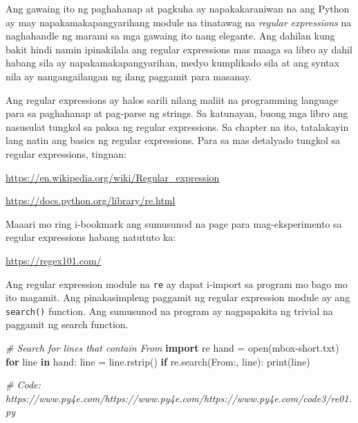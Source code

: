 \documentclass[10pt,]{book}
\newenvironment{Shaded}{}{}
\newcommand{\BuiltInTok}[1]{\textcolor[rgb]{0.00,0.50,0.00}{#1}}
\newcommand{\CommentTok}[1]{\textcolor[rgb]{0.38,0.63,0.69}{\textit{#1}}}
\newcommand{\ControlFlowTok}[1]{\textcolor[rgb]{0.00,0.44,0.13}{\textbf{#1}}}
\newcommand{\ImportTok}[1]{\textcolor[rgb]{0.00,0.50,0.00}{\textbf{#1}}}
\newcommand{\KeywordTok}[1]{\textcolor[rgb]{0.00,0.44,0.13}{\textbf{#1}}}
\newcommand{\NormalTok}[1]{#1}
\newcommand{\OperatorTok}[1]{\textcolor[rgb]{0.40,0.40,0.40}{#1}}
\newcommand{\StringTok}[1]{\textcolor[rgb]{0.25,0.44,0.63}{#1}}
\begin{document}
Ang gawaing ito ng paghahanap at pagkuha ay napakakaraniwan na ang
Python ay may napakamakapangyarihang module na tinatawag na
\emph{regular expressions} na naghahandle ng marami sa mga gawaing ito
nang elegante. Ang dahilan kung bakit hindi namin ipinakilala ang
regular expressions mas maaga sa libro ay dahil habang sila ay
napakamakapangyarihan, medyo kumplikado sila at ang syntax nila ay
nangangailangan ng ilang paggamit para masanay.

Ang regular expressions ay halos sarili nilang maliit na programming
language para sa paghahanap at pag-parse ng strings. Sa katunayan, buong
mga libro ang nasusulat tungkol sa paksa ng regular expressions. Sa
chapter na ito, tatalakayin lang natin ang basics ng regular
expressions. Para sa mas detalyado tungkol sa regular expressions,
tingnan:

\url{https://en.wikipedia.org/wiki/Regular_expression}

\url{https://docs.python.org/library/re.html}

Maaari mo ring i-bookmark ang sumusunod na page para mag-eksperimento sa
regular expressions habang natututo ka:

\url{https://regex101.com/}

Ang regular expression module na \texttt{re} ay dapat i-import sa
program mo bago mo ito magamit. Ang pinakasimpleng paggamit ng regular
expression module ay ang \texttt{search()} function. Ang sumusunod na
program ay nagpapakita ng trivial na paggamit ng search function.


\begin{Shaded}
\begin{Highlighting}[]
\CommentTok{\# Search for lines that contain \textquotesingle{}From\textquotesingle{}}
\ImportTok{import}\NormalTok{ re}
\NormalTok{hand }\OperatorTok{=} \BuiltInTok{open}\NormalTok{(}\StringTok{\textquotesingle{}mbox{-}short.txt\textquotesingle{}}\NormalTok{)}
\ControlFlowTok{for}\NormalTok{ line }\KeywordTok{in}\NormalTok{ hand:}
\NormalTok{    line }\OperatorTok{=}\NormalTok{ line.rstrip()}
    \ControlFlowTok{if}\NormalTok{ re.search(}\StringTok{\textquotesingle{}From:\textquotesingle{}}\NormalTok{, line):}
        \BuiltInTok{print}\NormalTok{(line)}

\CommentTok{\# Code: https://www.py4e.com/https://www.py4e.com/https://www.py4e.com/code3/re01.py}
\end{Highlighting}
\end{Shaded}
\end{document}

